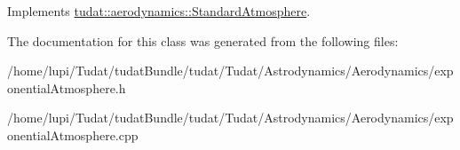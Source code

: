 Implements \hyperlink{classtudat_1_1aerodynamics_1_1StandardAtmosphere_ac5b9a16a96cbb496a4ee76b3dc495543}{tudat\+::aerodynamics\+::\+Standard\+Atmosphere}.



The documentation for this class was generated from the following files\+:\begin{DoxyCompactItemize}
\item 
/home/lupi/\+Tudat/tudat\+Bundle/tudat/\+Tudat/\+Astrodynamics/\+Aerodynamics/exponential\+Atmosphere.\+h\item 
/home/lupi/\+Tudat/tudat\+Bundle/tudat/\+Tudat/\+Astrodynamics/\+Aerodynamics/exponential\+Atmosphere.\+cpp\end{DoxyCompactItemize}
